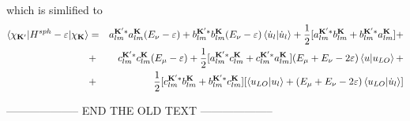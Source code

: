 \documentclass[aps,prb,floatfix,epsfig,singlecolumn,showpacs,preprintnumbers]{revtex4}
\newcommand{\vK}{{\mathbf{K}}}
\begin{document}
which is simlified to
\begin{eqnarray}
\braket{\chi_{\vK'}|H^{sph}-\varepsilon|\chi_\vK}&=&
a^{\vK' *}_{lm}  a_{lm}^{\vK}(E_\nu-\varepsilon)  + 
b^{\vK' *}_{lm}  b_{lm}^\vK(E_\nu-\varepsilon)\braket{\dot{u}_l|\dot{u}_l} +
\frac{1}{2}[a^{\vK' *}_{lm} b_{lm}^\vK +b_{lm}^{\vK'*} a^{\vK}_{lm} ]+
%
\nonumber\\
&+&
c^{\vK' *}_{lm}  c_{lm}^\vK(E_{\mu}-\varepsilon) +
\frac{1}{2}[a^{\vK' *}_{lm} c_{lm}^\vK + c^{\vK' *}_{lm} a_{lm}^\vK ]  (E_{\mu}+E_\nu-2\varepsilon)\braket{u|u_{LO}} +
\nonumber\\
&+&
\frac{1}{2}[c^{\vK' *}_{lm}  b_{lm}^\vK + b^{\vK' *}_{lm}  c_{lm}^\vK ][ \braket{u_{LO}|u_l}  + (E_\mu+E_\nu-2\varepsilon)\braket{u_{LO}|\dot{u}_l} ]
\label{Eq:HmE}
\end{eqnarray}

--------------------
END THE OLD TEXT
--------------------
\end{document}
